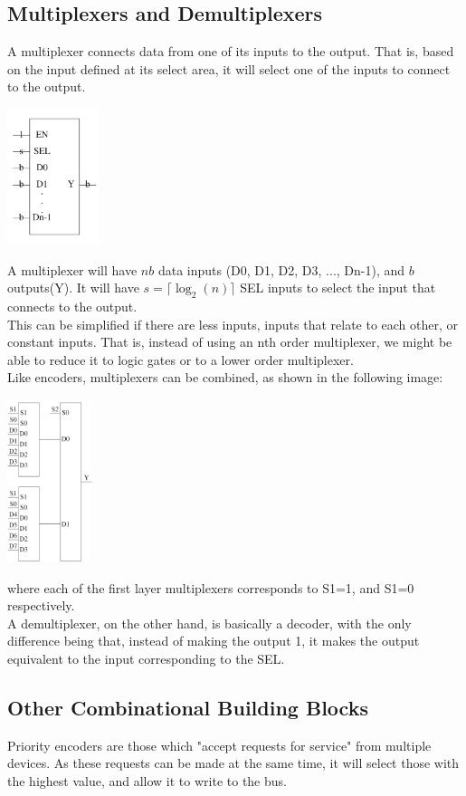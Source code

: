 \documentclass[nobib]{tufte-handout}
\begin{document}
\subsection{Multiplexers and Demultiplexers}
A multiplexer connects data from one of its inputs to the output. That is, based on the input defined at its select area, it will select one of the inputs to connect to the output.\\
\begin{center}
    \includegraphics[height = 150px]{images/multiplexer2.png}
\end{center}
A multiplexer will have $nb$ data inputs (D0, D1, D2, D3, ..., Dn-1), and $b$ outputs(Y). It will have $s=\lceil\log_2(n)\rceil$ SEL inputs to select the input that connects to the output.\\
This can be simplified if there are less inputs, inputs that relate to each other, or constant inputs. That is, instead of using an nth order multiplexer, we might be able to reduce it to logic gates or to a lower order multiplexer.\\
Like encoders, multiplexers can be combined, as shown in the following image:
\begin{center}
    \includegraphics[height = 180px]{images/bigmux.png}
\end{center}
where each of the first layer multiplexers corresponds to S1=1, and S1=0 respectively.\\
A demultiplexer, on the other hand, is basically a decoder, with the only difference being that, instead of making the output 1, it makes the output equivalent to the input corresponding to the SEL.\\
\subsection{Other Combinational Building Blocks}
Priority encoders are those which "accept requests for service" from multiple devices. As these requests can be made at the same time, it will select those with the highest value, and allow it to write to the bus.\\
\end{document}

